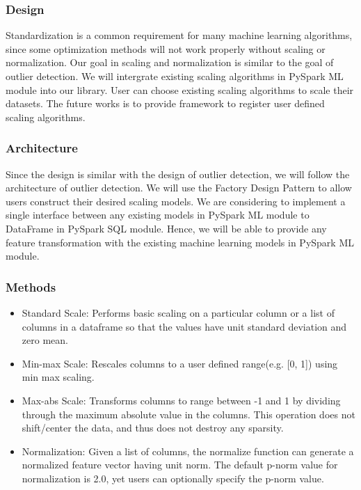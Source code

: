\documentclass[sigconf]{acmart}
\begin{document}
\subsubsection{Design}
Standardization is a common requirement for many machine learning algorithms, since some optimization methods will not work properly without scaling or normalization\cite{convex}. Our goal in scaling and normalization is similar to the goal of outlier detection. We will intergrate existing scaling algorithms in PySpark ML module into our library. User can choose existing scaling algorithms to scale their datasets. The future works is to provide framework to register user defined scaling algorithms.

\subsubsection{Architecture}
Since the design is similar with the design of outlier detection, we will follow the architecture of outlier detection. We will use the Factory Design Pattern to allow users construct their desired scaling models. We are considering to implement a single interface between any existing models in PySpark ML module to DataFrame in PySpark SQL module. Hence, we will be able to provide any feature transformation with the existing machine learning models in PySpark ML module.

\subsubsection{Methods}
\begin{itemize}
	\item{Standard Scale}: Performs basic scaling on a particular column or a list of columns in a dataframe so that the values have unit standard deviation and zero mean. 
	\item{Min-max Scale}: Rescales columns to a user defined range(e.g. [0, 1]) using min max scaling.
	\item{Max-abs Scale}: Transforms columns to range between -1 and 1 by dividing through the maximum absolute value in the columns. This operation does not shift/center the data, and thus does not destroy any sparsity. 
	\item{Normalization}: Given a list of columns, the normalize function can generate a normalized feature vector having unit norm. The default p-norm value for normalization is 2.0, yet users can optionally specify the p-norm value.
\end{itemize}
\end{document}

